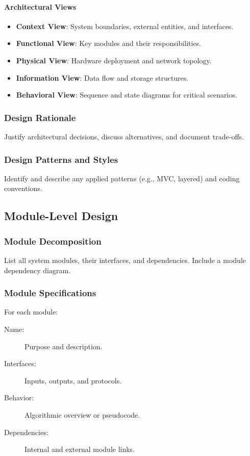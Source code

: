 \documentclass[12pt,a4paper]{report}
\begin{document}
\paragraph{Architectural Views}
\begin{itemize}
	\item \textbf{Context View}: System boundaries, external entities, and interfaces.
	\item \textbf{Functional View}: Key modules and their responsibilities.
	\item \textbf{Physical View}: Hardware deployment and network topology.
	\item \textbf{Information View}: Data flow and storage structures.
	\item \textbf{Behavioral View}: Sequence and state diagrams for critical scenarios.
\end{itemize}

\subsubsection{Design Rationale}
Justify architectural decisions, discuss alternatives, and document trade-offs.

\subsubsection{Design Patterns and Styles}
Identify and describe any applied patterns (e.g., MVC, layered) and coding conventions.

\subsection{Module-Level Design}
\subsubsection{Module Decomposition}
List all system modules, their interfaces, and dependencies. Include a module dependency diagram.

\subsubsection{Module Specifications}
For each module:
\begin{description}
	\item[Name:] Purpose and description.
	\item[Interfaces:] Inputs, outputs, and protocols.
	\item[Behavior:] Algorithmic overview or pseudocode.
	\item[Dependencies:] Internal and external module links.
\end{description}
\end{document}
